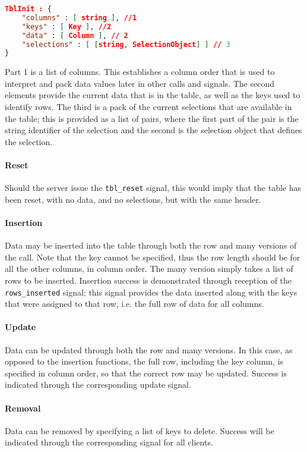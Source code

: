 \documentclass[11pt, oneside]{amsart}
\begin{document}
\begin{lstlisting}[language=json]
TblInit : {
	"columns" : [ string ], //1
    "keys" : [ Key ], //2
	"data" : [ Column ], // 2
	"selections" : [ [string, SelectionObject] ] // 3
}
\end{lstlisting}

Part 1 is a list of columns. This establishes a column order that is used to interpret and pack data values later in other calls and signals. The second elements provide the current data that is in the table, as well as the keys used to identify rows. The third is a pack of the current selections that are available in the table; this is provided as a list of pairs, where the first part of the pair is the string identifier of the selection and the second is the selection object that defines the selection.

\paragraph{\textbf{Reset}} Should the server issue the \texttt{tbl\_reset} signal, this would imply that the table has been reset, with no data, and no selections, but with the same header.

\paragraph{\textbf{Insertion}} Data may be inserted into the table through both the row and many versions of the call. Note that the key cannot be specified, thus the row length should be for all the other columns, in column order. The many version simply takes a list of rows to be inserted. Insertion success is demonstrated through reception of the \texttt{rows\_inserted} signal; this signal provides the data inserted along with the keys that were assigned to that row, i.e. the full row of data for all columns.

\paragraph{\textbf{Update}} Data can be updated through both the row and many versions. In this case, as opposed to the insertion functions, the full row, including the key column, is specified in column order, so that the correct row may be updated. Success is indicated through the corresponding update signal.

\paragraph{\textbf{Removal}} Data can be removed by specifying a list of keys to delete. Success will be indicated through the corresponding signal for all clients.
\end{document}
